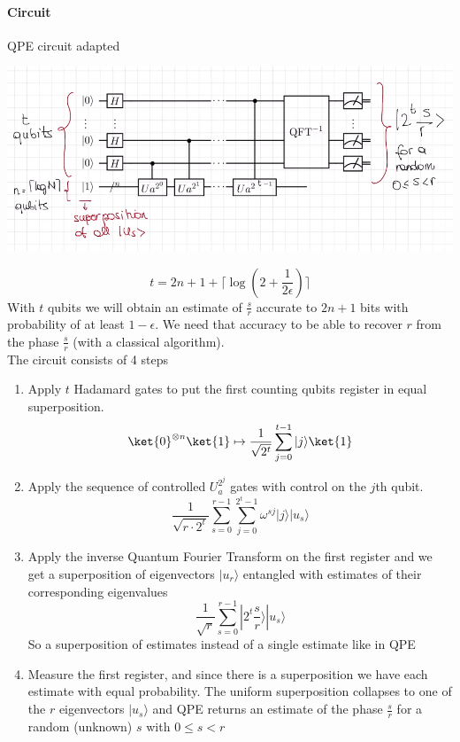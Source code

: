\documentclass[10pt]{report}
\begin{document}
\paragraph{Circuit} QPE circuit adapted\begin{center}
	\includegraphics[scale=0.5]{39.png}
\end{center}
$$ t= 2n+1+\lceil\log\left(2+\frac{1}{2\epsilon}\right)\rceil$$
With $t$ qubits we will obtain an estimate of $\frac{s}{r}$ accurate to $2n+1$ bits with probability of at least $1-\epsilon$. We need that accuracy to be able to recover $r$ from the phase $\frac{s}{r}$ (with a classical algorithm).\\
The circuit consists of 4 steps
\begin{enumerate}
	\item Apply $t$ Hadamard gates to put the first counting qubits register in equal superposition.
	$$\ket{0}^{\otimes n}\ket{1}\mapsto \frac{1}{\sqrt{2^t}}\sum_{j=0}^{t-1}|j\rangle\ket{1}$$
	\item Apply the sequence of controlled $U_a^{2^j}$ gates with control on the $j$th qubit.
	$$\frac{1}{\sqrt{r\cdot2^t}}\sum_{s=0}^{r-1}\sum_{j=0}^{2^t-1}\omega^{sj}|j\rangle|u_s\rangle$$
	\item Apply the inverse Quantum Fourier Transform on the first register and we get a superposition of eigenvectors $|u_r\rangle$ entangled with estimates of their corresponding eigenvalues
	$$\frac{1}{\sqrt{r}}\sum_{s=0}^{r-1}|2^t\frac{s}{r}\rangle|u_s\rangle $$
	So a superposition of estimates instead of a single estimate like in QPE
	\item Measure the first register, and since there is a superposition we have each estimate with equal probability. The uniform superposition collapses to one of the $r$ eigenvectors $|u_s\rangle$ and QPE returns an estimate of the phase $\frac{s}{r}$ for a random (unknown) $s$ with $0\leq s< r$
\end{enumerate}
\end{document}
